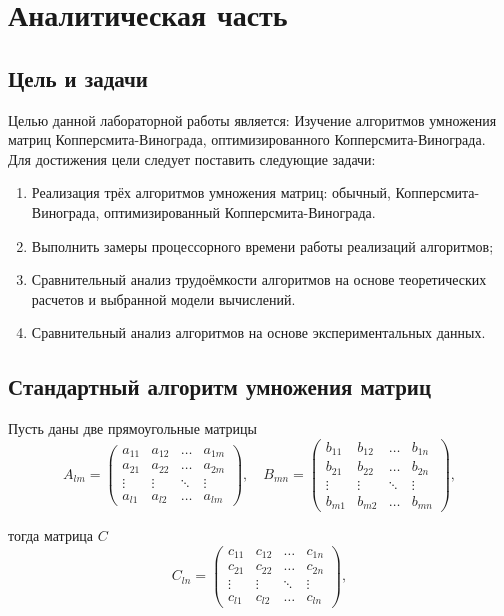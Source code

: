 \chapter{Аналитическая часть}
\section{Цель и задачи}
Целью данной лабораторной работы является: Изучение алгоритмов умножения матриц Копперсмита-Винограда, оптимизированного Копперсмита-Винограда.
Для достижения цели следует поставить следующие задачи: 

\begin{enumerate}
	\item Реализация трёх алгоритмов умножения матриц: обычный, Копперсмита-Винограда, оптимизированный Копперсмита-Винограда.
	\item Выполнить замеры процессорного времени работы реализаций алгоритмов;
	\item Сравнительный анализ трудоёмкости алгоритмов на основе теоретических расчетов и выбранной модели вычислений.
	\item Сравнительный анализ алгоритмов на основе экспериментальных данных.
\end{enumerate}

\newpage
\section{Стандартный алгоритм умножения матриц}

Пусть даны две прямоугольные матрицы
\begin{equation}
	A_{lm} = \begin{pmatrix}
		a_{11} & a_{12} & \ldots & a_{1m}\\
		a_{21} & a_{22} & \ldots & a_{2m}\\
		\vdots & \vdots & \ddots & \vdots\\
		a_{l1} & a_{l2} & \ldots & a_{lm}
	\end{pmatrix},
	\quad
	B_{mn} = \begin{pmatrix}
		b_{11} & b_{12} & \ldots & b_{1n}\\
		b_{21} & b_{22} & \ldots & b_{2n}\\
		\vdots & \vdots & \ddots & \vdots\\
		b_{m1} & b_{m2} & \ldots & b_{mn}
	\end{pmatrix},
\end{equation}

тогда матрица $C$
\begin{equation}
	C_{ln} = \begin{pmatrix}
		c_{11} & c_{12} & \ldots & c_{1n}\\
		c_{21} & c_{22} & \ldots & c_{2n}\\
		\vdots & \vdots & \ddots & \vdots\\
		c_{l1} & c_{l2} & \ldots & c_{ln}
	\end{pmatrix},
\end{equation}

